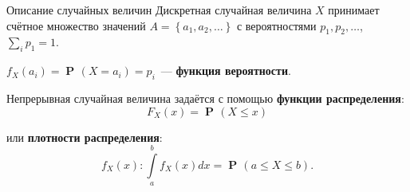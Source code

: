 \documentclass[9pt,pdf,utf8,hyperref={unicode},aspectratio=169]{beamer}
\DeclareMathOperator{\prob}{\mathbf{P}\!}
\begin{document}
\begin{frame}{Описание случайных величин}
Дискретная случайная величина $X$ принимает счётное множество значений $A = \left\{a_1,a_2,\dots \right\}$
с вероятностями $p_1,p_2,\dots$, $\sum\limits_{i}p_1=1.$ 

\bigskip

$f_X\!\left(a_i\right)=\prob\left(X=a_i\right)=p_i$~--- \textbf{функция вероятности}.

\bigskip

Непрерывная случайная величина задаётся с помощью \textbf{функции распределения}:
    $$F_X(x) = \prob\left(X\leq x\right)$$
    
    или \textbf{плотности распределения}:
    $$f_X\!\left(x\right)\colon \int\limits_a^b f_X\!\left(x\right) dx = \prob\left(a\leq X \leq b\right).$$
\end{frame}
\end{document}
